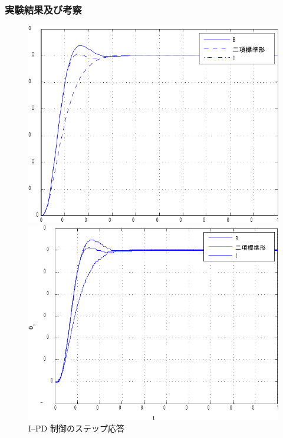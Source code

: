 \subsubsection{実験結果及び考察}
\begin{figure}[H]
    \centering
    \begin{minipage}[b]{0.48\linewidth}
      \centering
      \includegraphics[width=\linewidth]{figure/ex_ipd_sim-crop.pdf}
    \end{minipage}
    \begin{minipage}[b]{0.48\linewidth}
      \centering
      \includegraphics[width=\linewidth]{figure/ex_ipd-crop.pdf}
    \end{minipage}
    \caption{I--PD 制御のステップ応答}
    \label{fig:ipd_result}
  \end{figure}
  
